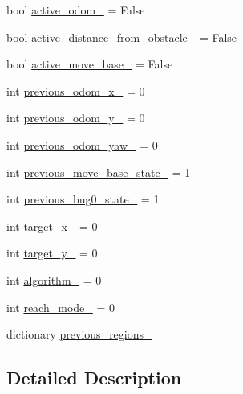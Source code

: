 \begin{DoxyCompactItemize}
\item 
bool \hyperlink{namespaceassignment__user__interface_aa01834f44f4e44650321fbb9663f67da}{active\+\_\+odom\+\_\+} = False
\item 
bool \hyperlink{namespaceassignment__user__interface_a70dc1cee92d2270ab06ead1271c932e9}{active\+\_\+distance\+\_\+from\+\_\+obstacle\+\_\+} = False
\item 
bool \hyperlink{namespaceassignment__user__interface_ab7e770bcccc99063ed51ef1d5df1d9ed}{active\+\_\+move\+\_\+base\+\_\+} = False
\item 
int \hyperlink{namespaceassignment__user__interface_a91f5626e7955992e66a7bd0cac0a7952}{previous\+\_\+odom\+\_\+x\+\_\+} = 0
\item 
int \hyperlink{namespaceassignment__user__interface_a7a311707e9b36a72fc254f7341c575f2}{previous\+\_\+odom\+\_\+y\+\_\+} = 0
\item 
int \hyperlink{namespaceassignment__user__interface_ab600fa7c306af18fef9abdbe3cabdb29}{previous\+\_\+odom\+\_\+yaw\+\_\+} = 0
\item 
int \hyperlink{namespaceassignment__user__interface_aa342342bb685561d0a4f86e3f8cebd9b}{previous\+\_\+move\+\_\+base\+\_\+state\+\_\+} = 1
\item 
int \hyperlink{namespaceassignment__user__interface_ad74ea24b9efe2549557256c0090ce5df}{previous\+\_\+bug0\+\_\+state\+\_\+} = 1
\item 
int \hyperlink{namespaceassignment__user__interface_aedad6b3f62bcb3c38ace17c74827840b}{target\+\_\+x\+\_\+} = 0
\item 
int \hyperlink{namespaceassignment__user__interface_a5a022bdefa93bc3cff83f4df7886f8d4}{target\+\_\+y\+\_\+} = 0
\item 
int \hyperlink{namespaceassignment__user__interface_ad60bfd8d9b50d535c32d8d0119fba104}{algorithm\+\_\+} = 0
\item 
int \hyperlink{namespaceassignment__user__interface_ab9cd545379c69c3aef5bf1db2d78e5ea}{reach\+\_\+mode\+\_\+} = 0
\item 
dictionary \hyperlink{namespaceassignment__user__interface_a1e414fbd95047464af11df1505f17bdb}{previous\+\_\+regions\+\_\+}
\end{DoxyCompactItemize}


\subsection{Detailed Description}
\begin{DoxyVerb}\end{DoxyVerb}
 


